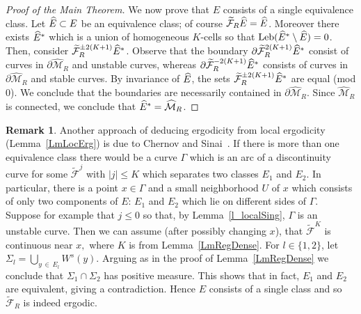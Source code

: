 \documentclass[10pt]{amsart}
\theoremstyle{definition}\newtheorem{defi}[theo]{Definition}\newtheorem{rema}[theo]{Remark}\newtheorem{exam}[theo]{Example}\newtheorem{exem}[theo]{Example}\newtheorem{nota}[theo]{Notation}
\newcommand{\csp}{\mathcal{M}}
\newcommand{\cspi}{\widehat{\csp}}
\newcommand{\tcF}{\widetilde{\mathcal{F}}}
\newcommand{\Leb}{\textup{Leb}}
\let\oldhat\hat
\renewcommand*{\hat}[1]{\mathchoice{\widehat{#1}}{\widehat{#1}}{\oldhat{#1}}{\oldhat{#1}}}
\begin{document}
\begin{proof}[Proof of the Main Theorem]
We now prove that $E$ consists of a single equivalence class. Let $\hat E\subset E$ be an equivalence class; of course $\tcF_{R}\hat E = \hat E$. Moreover there exists $\hat E^{*}$ which is a union of homogeneous $K$-cells so that $\Leb(\hat E^{*}\setminus \hat E) = 0$. Then, consider $\tcF_{R}^{\pm 2(K+1)}\hat E^{*}$. Observe that the boundary $\partial\tcF_{R}^{2(K+1)}\hat E^{*}$ consist of curves in $\partial\cspi_{R}$ and unstable curves, whereas $\partial\tcF_{R}^{-2(K+1)}\hat E^{*}$ consists of curves in $\partial\cspi_{R}$ and stable curves. By invariance of $\hat E$, the sets $\tcF_{R}^{\pm 2(K+1)}\hat E^{*}$ are equal (mod 0). We conclude that the boundaries are necessarily contained in $\partial\cspi_{R}$. Since $\cspi_{R}$ is connected, we conclude that $\hat E^{*} = \cspi_{R}$.
\end{proof}

\begin{rema}
Another approach of deducing ergodicity from local ergodicity (Lemma~\ref{LmLocErg}) is due to Chernov and Sinai~\cite{SC}. If there is more than one equivalence class there would be a curve $\Gamma$ which is an arc of a discontinuity curve for some $\tcF^j$ with $|j|\leq K$ which separates two classes $E_1$ and $E_2$. In particular, there is a point $x\in\Gamma$ and a small neighborhood $U$ of $x$ which consists of only two components of $E$: $E_1$ and $E_2$ which lie on different sides of $\Gamma$. Suppose for example that $j\leq 0$ so that, by Lemma~\ref{l_localSing}, $\Gamma$ is an unstable curve. Then we can assume (after possibly changing $x$), that $\tcF^K$ is continuous near $x,$ where $K$ is from Lemma~\ref{LmRegDense}. For $l\in\{1,2\}$, let $\Sigma_l=\bigcup_{y\,\in\,E_l} W^s(y).$ Arguing as in the proof of Lemma~\ref{LmRegDense} we conclude that $\Sigma_1\cap \Sigma_2$ has positive measure. This shows that in fact, $E_1$ and $E_2$ are equivalent, giving a contradiction. Hence $E$ consists of a single class and so $\tcF_R$ is indeed ergodic.
\end{rema}
\end{document}
